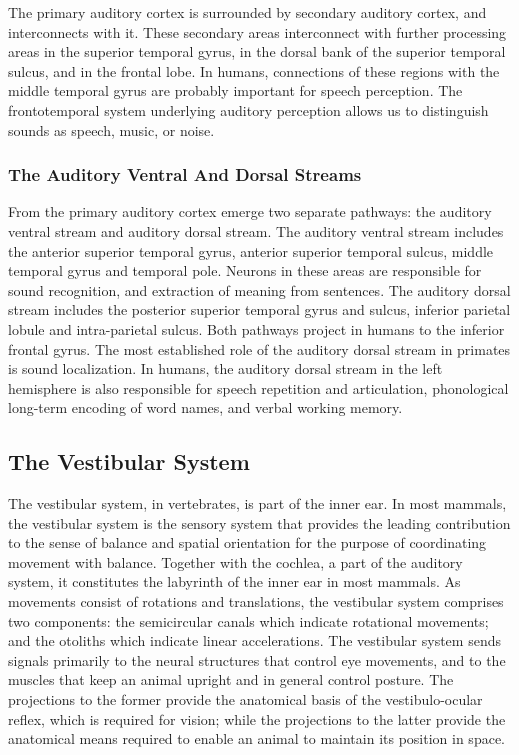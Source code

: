 The primary auditory cortex is surrounded by secondary auditory cortex,
and interconnects with it. These secondary areas interconnect with
further processing areas in the superior temporal gyrus, in the dorsal
bank of the superior temporal sulcus, and in the frontal lobe. In
humans, connections of these regions with the middle temporal gyrus are
probably important for speech perception. The frontotemporal system
underlying auditory perception allows us to distinguish sounds as
speech, music, or noise.

\hypertarget{the-auditory-ventral-and-dorsal-streams}{%
\subsubsection{The Auditory Ventral And Dorsal
Streams}\label{the-auditory-ventral-and-dorsal-streams}}

From the primary auditory cortex emerge two separate pathways: the
auditory ventral stream and auditory dorsal stream. The auditory ventral
stream includes the anterior superior temporal gyrus, anterior superior
temporal sulcus, middle temporal gyrus and temporal pole. Neurons in
these areas are responsible for sound recognition, and extraction of
meaning from sentences. The auditory dorsal stream includes the
posterior superior temporal gyrus and sulcus, inferior parietal lobule
and intra-parietal sulcus. Both pathways project in humans to the
inferior frontal gyrus. The most established role of the auditory dorsal
stream in primates is sound localization. In humans, the auditory dorsal
stream in the left hemisphere is also responsible for speech repetition
and articulation, phonological long-term encoding of word names, and
verbal working memory.

\hypertarget{the-vestibular-system}{%
\subsection{The Vestibular System}\label{the-vestibular-system}}

The vestibular system, in vertebrates, is part of the inner ear. In most
mammals, the vestibular system is the sensory system that provides the
leading contribution to the sense of balance and spatial orientation for
the purpose of coordinating movement with balance. Together with the
cochlea, a part of the auditory system, it constitutes the labyrinth of
the inner ear in most mammals. As movements consist of rotations and
translations, the vestibular system comprises two components: the
semicircular canals which indicate rotational movements; and the
otoliths which indicate linear accelerations. The vestibular system
sends signals primarily to the neural structures that control eye
movements, and to the muscles that keep an animal upright and in general
control posture. The projections to the former provide the anatomical
basis of the vestibulo-ocular reflex, which is required for vision;
while the projections to the latter provide the anatomical means
required to enable an animal to maintain its position in space.

